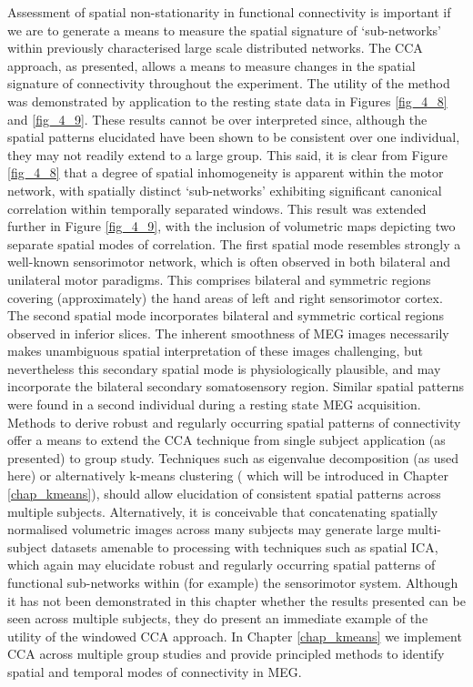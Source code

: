 Assessment of spatial non-stationarity in functional connectivity is important if we are to generate a means to measure the spatial signature of ‘sub-networks’ within previously characterised large scale distributed networks. The CCA approach, as presented, allows a means to measure changes in the spatial signature of connectivity throughout the experiment. The utility of the method was demonstrated by application to the resting state data in Figures \ref{fig_4_8} and \ref{fig_4_9}. These results cannot be over interpreted since, although the spatial patterns elucidated have been shown to be consistent over one individual, they may not readily extend to a large group. This said, it is clear from Figure \ref{fig_4_8} that a degree of spatial inhomogeneity is apparent within the motor network, with spatially distinct ‘sub-networks’ exhibiting significant canonical correlation within temporally separated windows. This result was extended further in Figure \ref{fig_4_9}, with the inclusion of volumetric maps depicting two separate spatial modes of correlation. The first spatial mode resembles strongly a well-known sensorimotor network, which is often observed in both bilateral and unilateral motor paradigms. This comprises bilateral and symmetric regions covering (approximately) the hand areas of left and right sensorimotor cortex. The second spatial mode incorporates bilateral and symmetric cortical regions observed in inferior slices. The inherent smoothness of MEG images necessarily makes unambiguous spatial interpretation of these images challenging, but nevertheless this secondary spatial mode is physiologically plausible, and may incorporate the bilateral secondary somatosensory region. Similar spatial patterns were found in a second individual during a resting state MEG acquisition. Methods to derive robust and regularly occurring spatial patterns of connectivity offer a means to extend the CCA technique from single subject application (as presented) to group study. Techniques such as eigenvalue decomposition (as used here) or alternatively k-means clustering (\citealp{MacQueen1967,Allen2014,Liu2013} which will be introduced in Chapter \ref{chap_kmeans}), should allow elucidation of consistent spatial patterns across multiple subjects. Alternatively, it is conceivable that concatenating spatially normalised volumetric images across many subjects may generate large multi-subject datasets amenable to processing with techniques such as spatial ICA, which again may elucidate robust and regularly occurring spatial patterns of functional sub-networks within (for example) the sensorimotor system. Although it has not been demonstrated in this chapter whether the results presented can be seen across multiple subjects, they do present an immediate example of the utility of the windowed CCA approach. In Chapter \ref{chap_kmeans} we implement CCA across multiple group studies and provide principled methods to identify spatial and temporal modes of connectivity in MEG.  

